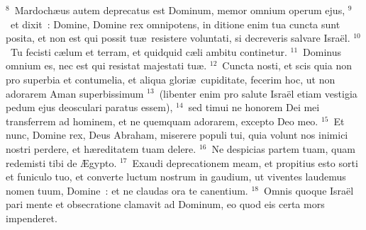 ${}^{8}$~Mardoch\ae us autem deprecatus est Dominum, memor omnium operum ejus,
${}^{9}$~et dixit~: Domine, Domine rex omnipotens, in ditione enim tua cuncta sunt posita, et non est qui possit tu\ae\ resistere voluntati, si decreveris salvare Isra\"el.
${}^{10}$~Tu fecisti c\ae lum et terram, et quidquid c\ae li ambitu continetur.
${}^{11}$~Dominus omnium es, nec est qui resistat majestati tu\ae .
${}^{12}$~Cuncta nosti, et scis quia non pro superbia et contumelia, et aliqua glori\ae\ cupiditate, fecerim hoc, ut non adorarem Aman superbissimum
${}^{13}$~(libenter enim pro salute Isra\"el etiam vestigia pedum ejus deosculari paratus essem),
${}^{14}$~sed timui ne honorem Dei mei transferrem ad hominem, et ne quemquam adorarem, excepto Deo meo.
${}^{15}$~Et nunc, Domine rex, Deus Abraham, miserere populi tui, quia volunt nos inimici nostri perdere, et h\ae reditatem tuam delere.
${}^{16}$~Ne despicias partem tuam, quam redemisti tibi de \AE gypto.
${}^{17}$~Exaudi deprecationem meam, et propitius esto sorti et funiculo tuo, et converte luctum nostrum in gaudium, ut viventes laudemus nomen tuum, Domine~: et ne claudas ora te canentium.
${}^{18}$~Omnis quoque Isra\"el pari mente et obsecratione clamavit ad Dominum, eo quod eis certa mors impenderet.

